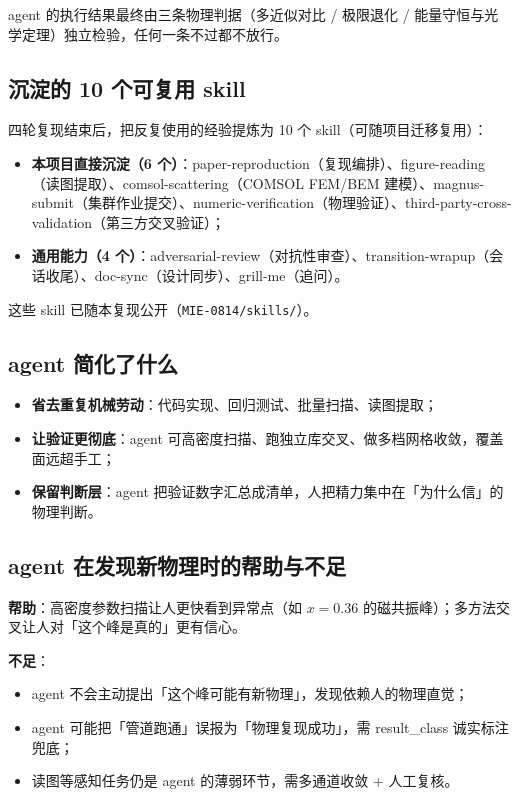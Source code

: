 agent 的执行结果最终由三条物理判据（多近似对比 / 极限退化 / 能量守恒与光学定理）独立检验，任何一条不过都不放行。

\subsection{沉淀的 10 个可复用 skill}

四轮复现结束后，把反复使用的经验提炼为 10 个 skill（可随项目迁移复用）：

\begin{itemize}
  \item \textbf{本项目直接沉淀（6 个）}：paper-reproduction（复现编排）、figure-reading（读图提取）、comsol-scattering（COMSOL FEM/BEM 建模）、magnus-submit（集群作业提交）、numeric-verification（物理验证）、third-party-cross-validation（第三方交叉验证）；
  \item \textbf{通用能力（4 个）}：adversarial-review（对抗性审查）、transition-wrapup（会话收尾）、doc-sync（设计同步）、grill-me（追问）。
\end{itemize}

这些 skill 已随本复现公开（\texttt{MIE-0814/skills/}）。

\subsection{agent 简化了什么}

\begin{itemize}
  \item \textbf{省去重复机械劳动}：代码实现、回归测试、批量扫描、读图提取；
  \item \textbf{让验证更彻底}：agent 可高密度扫描、跑独立库交叉、做多档网格收敛，覆盖面远超手工；
  \item \textbf{保留判断层}：agent 把验证数字汇总成清单，人把精力集中在「为什么信」的物理判断。
\end{itemize}

\subsection{agent 在发现新物理时的帮助与不足}

\textbf{帮助}：高密度参数扫描让人更快看到异常点（如 $x=0.36$ 的磁共振峰）；多方法交叉让人对「这个峰是真的」更有信心。

\textbf{不足}：
\begin{itemize}
  \item agent 不会主动提出「这个峰可能有新物理」，发现依赖人的物理直觉；
  \item agent 可能把「管道跑通」误报为「物理复现成功」，需 result\_class 诚实标注兜底；
  \item 读图等感知任务仍是 agent 的薄弱环节，需多通道收敛 + 人工复核。
\end{itemize}
